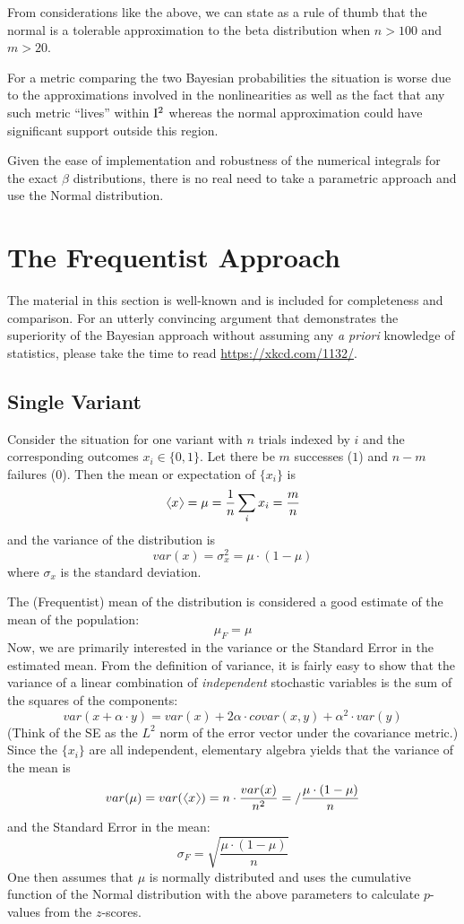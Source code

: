 \documentclass[letterpaper,12pt]{article}
\newcommand{\bdm}{\begin{displaymath}} %
\newcommand{\edm}{\end{displaymath}} %
\newcommand{\langl}{\begin{picture}(4.5,7)
\put(1.1,2.5){\rotatebox{60}{\line(1,0){5.5}}}
\put(1.1,2.5){\rotatebox{300}{\line(1,0){5.5}}}
\end{picture}}
\newcommand{\rangl}{\begin{picture}(4.5,7)
\put(.9,2.5){\rotatebox{120}{\line(1,0){5.5}}}
\put(.9,2.5){\rotatebox{240}{\line(1,0){5.5}}}
\end{picture}}
\newcommand{\mymean}[1]{\ensuremath{\langl{#1}\rangl}} %
\begin{document}
From considerations like the above, we can state as a rule of thumb
that the normal
is a tolerable approximation to the beta distribution when \(n>100\)
and \(m>20\).

For a metric comparing the two Bayesian probabilities the situation is worse
due to the approximations involved in the nonlinearities as well as the fact
that any such metric ``lives'' within \({\rm I}^2\) whereas the
normal approximation could have significant support outside this region. 

Given the ease of implementation and robustness of the numerical
integrals for the exact \(\beta\) distributions, there is no real need
to take a parametric approach and use the Normal distribution.

\section{The Frequentist Approach}
\label{sec:frequentist}
The material in this section is well-known and is included for completeness
and comparison. For an utterly convincing argument that demonstrates the
superiority of the Bayesian approach without assuming any {\em a priori}
knowledge of statistics, please take the time to read
\url{https://xkcd.com/1132/}.

\subsection{Single Variant}\label{sec:frequentist1D}
Consider the situation for one variant 
with \(n\) trials indexed by \(i\) and the corresponding
outcomes \(x_i\in \{0,1\}\). Let there be \(m\) successes (\(1\))
and \(n-m\) failures (\(0\)). Then the mean or expectation of \(\{x_i\}\) is
\bdm
\mymean{x} = \mu = \frac{1}{n}\sum_i x_i = \frac{m}{n}
\edm
and the variance of the distribution is
\bdm
var(x) = \sigma^2_x = \mu\cdot(1-\mu)
\edm
where \(\sigma_x\) is the standard deviation.

The (Frequentist) mean of the distribution is considered a good estimate
of the mean of the population:
\bdm
\mu_F = \mu
\edm
Now, we are primarily interested in the variance or the
Standard Error in the estimated mean. From the definition of variance, it
is fairly easy to show that the variance of a linear combination of
{\em independent} stochastic variables is the sum of the squares of the
components:
\bdm
var(x+\alpha\cdot y) = var(x) + 2\alpha\cdot covar(x,y)+ \alpha^2\cdot var(y)
\edm
(Think of the SE as the \(L^2\) norm of the error vector under the covariance
metric.) Since the \(\{x_i\}\) are all independent, elementary algebra yields
that the variance of the mean is
\bdm
var(\mu) = var(\mymean{x}) = n\cdot\frac{var(x)}{n^2} =/
\frac{\mu\cdot(1-\mu)}{n}
\edm
and the Standard Error in the mean:
\bdm
\sigma_F = \sqrt{\frac{\mu\cdot(1-\mu)}{n}}
\edm
One then assumes that \(\mu\) is normally distributed and uses the
cumulative function of the Normal distribution with the above parameters to
calculate \(p\)-values from the \(z\)-scores.
\end{document}
